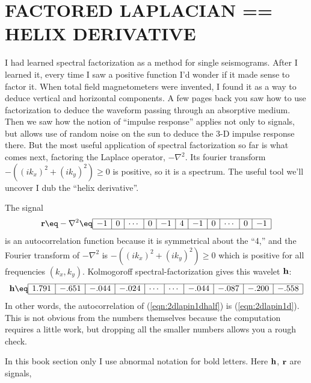 \section{FACTORED LAPLACIAN == HELIX DERIVATIVE}
I had learned spectral factorization as a method for single seismograms.
After I learned it,
every time I saw a positive function
I'd wonder if it made sense to factor it.
When total field
magnetometers were invented,
I found it as a way to deduce vertical and horizontal
components.
A few pages back you saw how to use factorization
to deduce the waveform passing through an absorptive medium.
Then we saw how the notion of ``impulse response''
applies not only to signals,
but allows use of random noise on the sun
to deduce the 3-D impulse response there.
But the most useful application of spectral factorization so far
is what comes next, factoring the Laplace operator, $-\nabla^2$.
Its fourier transform $-((ik_x)^2+(ik_y)^2) \ge 0$ is positive, so it is a spectrum.
The useful tool we'll uncover I dub the ``helix derivative''.
\par
The signal
\begin{equation}
\label{eqn:2dlapin1d}
\bold r \eq
-\nabla^2
\eq
\begin{array}{|r|r|r|r|r|r|r|r|r|r|r|r|r|r|r|} \hline
-1&0&\cdots&0&-1&4&-1&0& \cdots&0&-1
\\ \hline
\end{array}
\end{equation}
is an autocorrelation function because
it is symmetrical about the ``4,''
and the Fourier transform of $-\nabla^2$ is $-((ik_x)^2+(ik_y)^2) \ge 0$
which is positive for all frequencies $(k_x,k_y)$.
Kolmogoroff spectral-factorization gives this wavelet $\bold h $:
\begin{equation}
\label{eqn:2dlapin1dhalf}
{\bold h}
\eq
\begin{array}{|r|r|r|r|r|r|r|r|r|r|r|r|r|r|r|}
\hline
1.791&-.651&-.044&-.024&\cdots&\cdots&-.044&-.087&-.200&-.558 \\
\hline
\end{array}
\label{eqn:lapfacrow}
\end{equation}
In other words,
the autocorrelation of
(\ref{eqn:2dlapin1dhalf}) is
(\ref{eqn:2dlapin1d}).
This is not obvious from the numbers themselves
because the computation requires a little work,
but dropping all the smaller numbers
allows you a rough check.
\par
In this book section only I use abnormal notation for bold letters.
Here
$\bold h$, $\bold r$ are signals,
